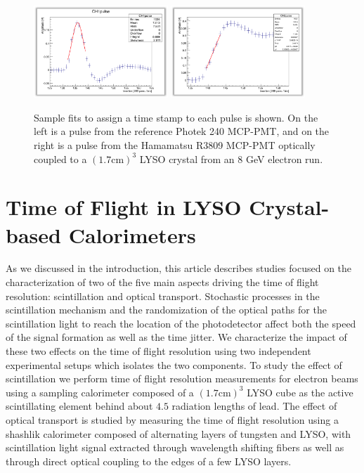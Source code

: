 \documentclass[12pt]{article}
\begin{document}
\begin{figure}[h] \centering
\includegraphics[width=0.45\textwidth]{figs/RefPulseFit} 
\includegraphics[width=0.45\textwidth]{figs/ScintPulseFit} 
\caption{Sample fits to assign a time stamp to each pulse is shown. 
On the left is a pulse from the reference Photek 240 MCP-PMT, and
on the right is a pulse from the Hamamatsu R3809 MCP-PMT
optically coupled to a $(1.7\mathrm{ cm})^3$  LYSO crystal
from an 8 GeV electron run.}
\label{fig:PulseFits}
\end{figure}


\section{Time of Flight in LYSO Crystal-based Calorimeters}

As we discussed in the introduction, this article describes studies
focused on the characterization of two of the five main aspects
driving the time of flight resolution: scintillation and 
optical transport. Stochastic processes in the scintillation
mechanism and the randomization of the optical paths for the 
scintillation light to reach the location of the photodetector 
affect both the speed of the signal formation
as well as the time jitter. We characterize the impact of
these two effects on the time of flight resolution using
two independent experimental setups which isolates the
two components. To study the effect of scintillation
we perform time of flight resolution measurements
for electron beams using a sampling calorimeter composed of a 
$(1.7\mathrm{ cm})^{3}$ LYSO cube as the active 
scintillating element behind about $4.5$ radiation lengths of lead. 
The effect of optical transport is studied by measuring
the time of flight resolution using a shashlik 
calorimeter composed of alternating layers of tungsten
and LYSO, with scintillation light signal extracted
through wavelength shifting fibers as well as 
through direct optical coupling to the edges of a few
LYSO layers. 
\end{document}
